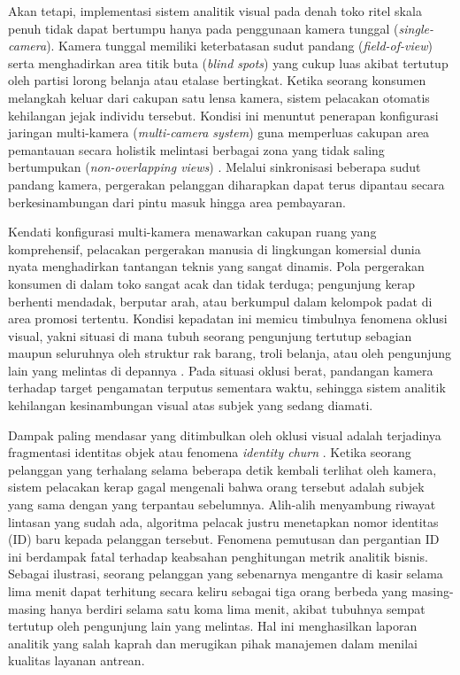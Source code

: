 Akan tetapi, implementasi sistem analitik visual pada denah toko ritel skala penuh tidak dapat bertumpu hanya pada penggunaan kamera tunggal (\textit{single-camera}). Kamera tunggal memiliki keterbatasan sudut pandang (\textit{field-of-view}) serta menghadirkan area titik buta (\textit{blind spots}) yang cukup luas akibat tertutup oleh partisi lorong belanja atau etalase bertingkat. Ketika seorang konsumen melangkah keluar dari cakupan satu lensa kamera, sistem pelacakan otomatis kehilangan jejak individu tersebut. Kondisi ini menuntut penerapan konfigurasi jaringan multi-kamera (\textit{multi-camera system}) guna memperluas cakupan area pemantauan secara holistik melintasi berbagai zona yang tidak saling bertumpukan (\textit{non-overlapping views}) \cite{fierrosilva2026}. Melalui sinkronisasi beberapa sudut pandang kamera, pergerakan pelanggan diharapkan dapat terus dipantau secara berkesinambungan dari pintu masuk hingga area pembayaran.

Kendati konfigurasi multi-kamera menawarkan cakupan ruang yang komprehensif, pelacakan pergerakan manusia di lingkungan komersial dunia nyata menghadirkan tantangan teknis yang sangat dinamis. Pola pergerakan konsumen di dalam toko sangat acak dan tidak terduga; pengunjung kerap berhenti mendadak, berputar arah, atau berkumpul dalam kelompok padat di area promosi tertentu. Kondisi kepadatan ini memicu timbulnya fenomena oklusi visual, yakni situasi di mana tubuh seorang pengunjung tertutup sebagian maupun seluruhnya oleh struktur rak barang, troli belanja, atau oleh pengunjung lain yang melintas di depannya \cite{panagos2026, mendes2023multi}. Pada situasi oklusi berat, pandangan kamera terhadap target pengamatan terputus sementara waktu, sehingga sistem analitik kehilangan kesinambungan visual atas subjek yang sedang diamati.

Dampak paling mendasar yang ditimbulkan oleh oklusi visual adalah terjadinya fragmentasi identitas objek atau fenomena \textit{identity churn} \cite{fierrosilva2026}. Ketika seorang pelanggan yang terhalang selama beberapa detik kembali terlihat oleh kamera, sistem pelacakan kerap gagal mengenali bahwa orang tersebut adalah subjek yang sama dengan yang terpantau sebelumnya. Alih-alih menyambung riwayat lintasan yang sudah ada, algoritma pelacak justru menetapkan nomor identitas (ID) baru kepada pelanggan tersebut. Fenomena pemutusan dan pergantian ID ini berdampak fatal terhadap keabsahan penghitungan metrik analitik bisnis. Sebagai ilustrasi, seorang pelanggan yang sebenarnya mengantre di kasir selama lima menit dapat terhitung secara keliru sebagai tiga orang berbeda yang masing-masing hanya berdiri selama satu koma lima menit, akibat tubuhnya sempat tertutup oleh pengunjung lain yang melintas. Hal ini menghasilkan laporan analitik yang salah kaprah dan merugikan pihak manajemen dalam menilai kualitas layanan antrean.

